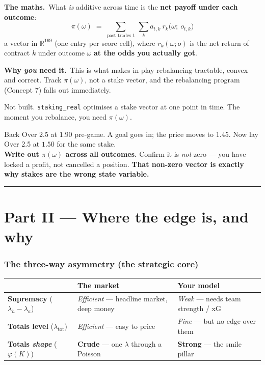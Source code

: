 \documentclass[11pt,a4paper]{article}
\newcommand{\formula}[1]{\smallskip\noindent\textbf{\small The maths.}\ #1}
\newcommand{\whyyou}[1]{\smallskip\noindent\textbf{\small Why \emph{you} need it.}\ \small #1\normalsize}
\begin{document}
\formula{What \emph{is} additive across time is the \textbf{net payoff under each outcome}:
\[
  \boxed{\;
  \pi(\omega) \;=\; \sum_{\text{past trades } t}\ \sum_k a_{t,k}\ r_k\big(\omega;\ o_{t,k}\big)
  \;}
\]
a vector in $\mathbb{R}^{169}$ (one entry per score cell), where $r_k(\omega; o)$ is the net return of
contract $k$ under outcome $\omega$ \textbf{at the odds you actually got}.}

\whyyou{This is what makes in-play rebalancing tractable, convex and correct. Track $\pi(\omega)$, not a
stake vector, and the rebalancing program (Concept 7) falls out immediately.}

\begin{gapbox}
Not built. \texttt{staking\_real} optimises a stake vector at one point in time. The moment you rebalance,
you need $\pi(\omega)$.
\end{gapbox}

\begin{exercise}
Back Over 2.5 at $1.90$ pre-game. A goal goes in; the price moves to $1.45$. Now lay Over 2.5 at $1.50$ for
the same stake. \\
\textbf{Write out $\pi(\omega)$ across all outcomes.} Confirm it is \emph{not} zero --- you have locked a
profit, not cancelled a position. \textbf{That non-zero vector is exactly why stakes are the wrong state
variable.}
\end{exercise}

\bigskip\hrule\bigskip

\part*{Part II --- Where the edge is, and why}

\section{The three-way asymmetry (the strategic core)}

\begin{center}
\begin{tabular}{@{}lll@{}}
\toprule
& \textbf{The market} & \textbf{Your model} \\
\midrule
\textbf{Supremacy} ($\lambda_h - \lambda_a$) & \emph{Efficient} --- headline market, deep money & \emph{Weak} --- needs team strength / xG \\
\textbf{Totals level} ($\lambda_{\text{tot}}$) & \emph{Efficient} --- easy to price & \emph{Fine} --- but no edge over them \\
\textbf{Totals \emph{shape}} ($\varphi(K)$) & \textbf{Crude} --- one $\lambda$ through a Poisson & \textbf{Strong} --- the smile pillar \\
\bottomrule
\end{tabular}
\end{center}
\end{document}
